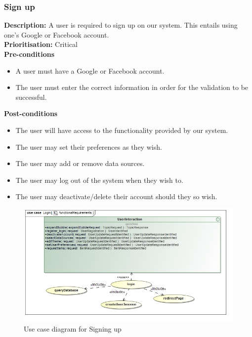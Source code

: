 \documentclass[hidelinks,english]{article}
\begin{document}
			\subsubsection{Sign up}
				\textbf{Description:}  A user is required to sign up on our system. This entails using one's Google or Facebook account.\\
    			\textbf{Prioritisation:} Critical\\
      			\textbf{Pre-conditions}
    			\begin{itemize}
        			\item A user must have a Google or Facebook account.
        			\item The user must enter the correct information in order for the validation to be successful.
    			\end{itemize}
    			\textbf{Post-conditions}
     			\begin{itemize}
        			\item The user will have access to the functionality provided by our system.
        			\item The user may set their preferences as they wish.
        			\item The user may add or remove data sources.
        			\item The user may log out of the system when they wish to.
        			\item The user may deactivate/delete their account should they so wish.
    			\end{itemize}
    			
    			\begin{figure}[!h]
    			\includegraphics[width=\linewidth]{login_RegistrationFunctionalRequirements.jpg}
    			\caption{Use case diagram for Signing up}
    			\label{UseCaseSignUp}
    			\end{figure}
    			
\end{document}
